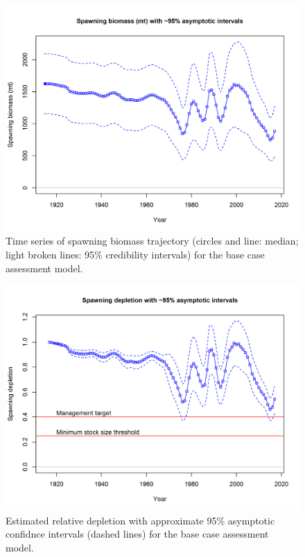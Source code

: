 \documentclass[12pt,]{article}
\begin{document}
\FloatBarrier

\begin{figure}[htbp]
\centering
\includegraphics{r4ss/plots_mod1/ts7_Spawning_biomass_(mt)_with_95_asymptotic_intervals_intervals.png}
\caption{Time series of spawning biomass trajectory (circles and line:
median; light broken lines: 95\% credibility intervals) for the base
case assessment model. \label{fig:Spawnbio_all}}
\end{figure}

\begin{figure}[htbp]
\centering
\includegraphics{r4ss/plots_mod1/ts9_Spawning_depletion_with_95_asymptotic_intervals_intervals.png}
\caption{Estimated relative depletion with approximate 95\% asymptotic
confidnce intervals (dashed lines) for the base case assessment model.
\label{fig:RelDeplete_all}}
\end{figure}
\end{document}
